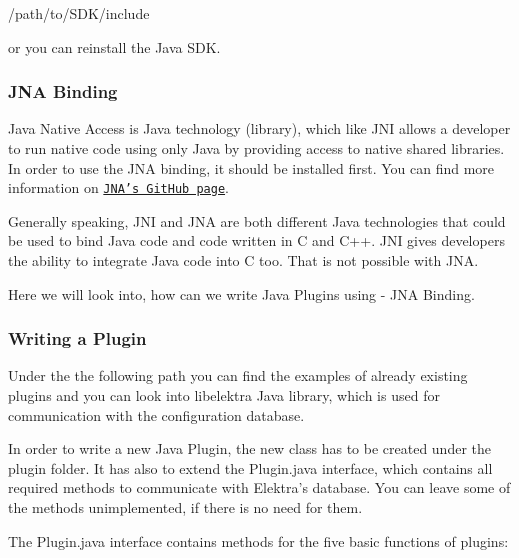 \begin{DoxyItemize}
\item {\ttfamily /path/to/\+S\+D\+K/include}
\end{DoxyItemize}

or you can reinstall the Java S\+DK.

\subsubsection*{J\+NA Binding}

Java Native Access is Java technology (library), which like J\+NI allows a developer to run native code using only Java by providing access to native shared libraries. In order to use the J\+NA binding, it should be installed first. You can find more information on \href{https://github.com/java-native-access/jna}{\tt J\+N\+A’s Git\+Hub page}.

Generally speaking, {\ttfamily J\+NI} and {\ttfamily J\+NA} are both different Java technologies that could be used to bind Java code and code written in C and C++. {\ttfamily J\+NI} gives developers the ability to integrate Java code into C too. That is not possible with {\ttfamily J\+NA}.

Here we will look into, how can we write Java Plugins using -\/ {\ttfamily J\+NA Binding}.

\subsubsection*{Writing a Plugin}

Under the the following path you can find the examples of already existing plugins and you can look into libelektra Java library, which is used for communication with the configuration database.

In order to write a new Java Plugin, the new class has to be created under the {\ttfamily plugin} folder. It has also to extend the {\ttfamily Plugin.\+java} interface, which contains all required methods to communicate with Elektra’s database. You can leave some of the methods unimplemented, if there is no need for them.

The {\ttfamily Plugin.\+java} interface contains methods for the five basic functions of plugins\+:


